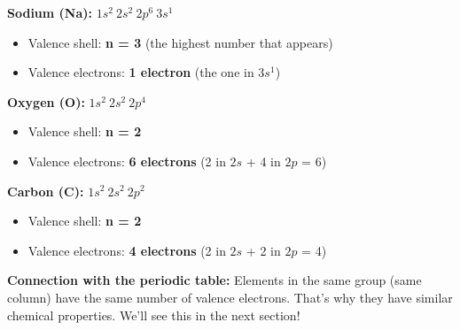 \begin{example}
    \textbf{Sodium (Na):} \( 1s^2\ 2s^2\ 2p^6\ 3s^1 \)
    \begin{itemize}
        \item Valence shell: \textbf{n = 3} (the highest number that appears)
        \item Valence electrons: \textbf{1 electron} (the one in \( 3s^1 \))
    \end{itemize}

    \textbf{Oxygen (O):} \( 1s^2\ 2s^2\ 2p^4 \)
    \begin{itemize}
        \item Valence shell: \textbf{n = 2}
        \item Valence electrons: \textbf{6 electrons} (2 in \( 2s \) + 4 in \( 2p \) = 6)
    \end{itemize}

    \textbf{Carbon (C):} \( 1s^2\ 2s^2\ 2p^2 \)
    \begin{itemize}
        \item Valence shell: \textbf{n = 2}
        \item Valence electrons: \textbf{4 electrons} (2 in \( 2s \) + 2 in \( 2p \) = 4)
    \end{itemize}
\end{example}
\begin{remark}
    \textbf{Connection with the periodic table:} Elements in the same group (same column) have the same number of valence electrons. That's why they have similar chemical properties. We'll see this in the next section!
\end{remark}
